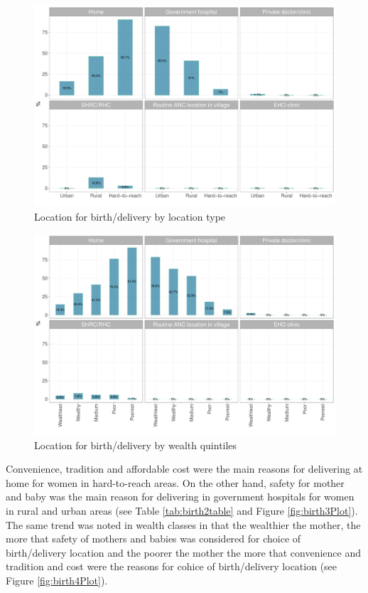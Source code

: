 \documentclass[12pt,a4paper]{article}
\begin{document}
\begin{figure}[H]

{\centering \includegraphics{kayahReport_files/figure-latex/birth1Plot-1} 

}

\caption{Location for birth/delivery by location type}\label{fig:birth1Plot}
\end{figure}

\begin{figure}[H]

{\centering \includegraphics{kayahReport_files/figure-latex/birth2Plot-1} 

}

\caption{Location for birth/delivery by wealth quintiles}\label{fig:birth2Plot}
\end{figure}

Convenience, tradition and affordable cost were the main reasons for delivering at home for women in hard-to-reach areas. On the other hand, safety for mother and baby was the main reason for delivering in government hospitals for women in rural and urban areas (see Table \ref{tab:birth2table} and Figure \ref{fig:birth3Plot}). The same trend was noted in wealth classes in that the wealthier the mother, the more that safety of mothers and babies was considered for choice of birth/delivery location and the poorer the mother the more that convenience and tradition and cost were the reasons for cohice of birth/delivery location (see Figure \ref{fig:birth4Plot}).
\end{document}
